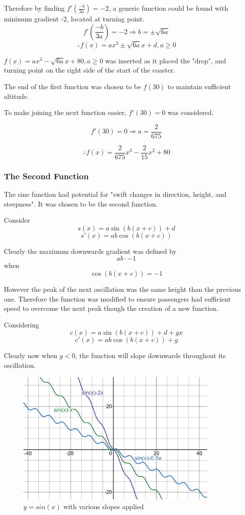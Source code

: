 \documentclass[11pt, letterpaper]{article}
\begin{document}
Therefore by finding $f'(\frac{-b}{3a})=-2$, a generic function could be found with minimum gradient -2, located at turning point.
 $$f'(\frac{-b}{3a})=-2\Rightarrow b=\pm\sqrt{6a}$$
$$\therefore f(x)=ax^3\pm\sqrt{6a}x+d, a\geq0$$

$f(x)=ax^3-\sqrt{6a}x+80, a\geq0$ was inserted as it placed the "drop", and turning point on the right side of the start of the coaster.

The end of the first function was chosen to be $f(30)$ to maintain sufficient altitude.

To make joining the next function easier, $f'(30)=0$ was considered. 

$$f'(30)=0 \Rightarrow a=\frac{2}{675}$$

$$\therefore f(x)=\frac{2}{675}x^{3}-\frac{2}{15}x^{2}+80$$


\subsubsection{The Second Function}
The sine function had potential for "swift changes in direction, height, and steepness". It was chosen to be the second function.

Consider $$s(x)=a\sin(b(x+c))+d $$
$$s'(x)=ab\cos(b(x+c))$$

Clearly the maximum downwards gradient was defined by $$ab\cdot-1$$
when
$$\cos(b(x+c))=-1$$

However the peak of the next oscillation was the same height than the previous one. Therefore the function was modified to ensure passengers had sufficient speed to overcome the next peak though the creation of a new function.

Considering
$$c(x)=a\sin(b(x+c))+d+gx$$ 
$$c'(x)=ab\cos(b(x+c))+g$$

Clearly now when $g<0$, the function will slope downwards throughout its oscillation. 

	\begin{figure}[h!]
		\centering
		\includegraphics[width=10cm]{c(x).png}
		\caption{$y=sin(x)$ with various slopes applied}
	\end{figure}
	\pagebreak
\end{document}

